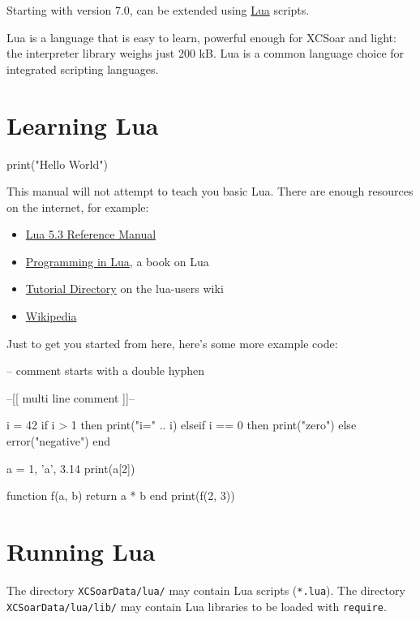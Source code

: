 {\lstset{language=[5.0]Lua}}
{}

Starting with version 7.0, \xc can be extended using
\href{http://www.lua.org/}{Lua} scripts.

Lua is a language that is easy to learn, powerful enough for XCSoar
and light: the interpreter library weighs just 200 kB.  Lua is a
common language choice for integrated scripting languages.

\section{Learning Lua}

\begin{lua}
print("Hello World")
\end{lua}

This manual will not attempt to teach you basic Lua.  There are enough
resources on the internet, for example:

\begin{itemize}
\item \href{http://www.lua.org/manual/5.3/}{Lua 5.3 Reference Manual}
\item \href{http://www.lua.org/pil/contents.html}{Programming in
  Lua}, a book on Lua
\item \href{http://lua-users.org/wiki/TutorialDirectory}{Tutorial
  Directory} on the lua-users wiki
\item \href{https://en.wikipedia.org/wiki/Lua_%28programming_language%29}{Wikipedia}
\end{itemize}

Just to get you started from here, here's some more example code:

\begin{lua}
-- comment starts with a double hyphen

--[[
multi
line
comment
]]--

i = 42
if i > 1 then
   print("i=" .. i)
elseif i == 0 then
   print("zero")
else
   error("negative")
end

a = {1, 'a', 3.14}
print(a[2])

function f(a, b)
   return a * b
end
print(f(2, 3))
\end{lua}

\section{Running Lua}

The directory \texttt{XCSoarData/lua/} may contain Lua scripts
(\texttt{*.lua}).  The directory \texttt{XCSoarData/lua/lib/} may
contain Lua libraries to be loaded with \texttt{require}.

